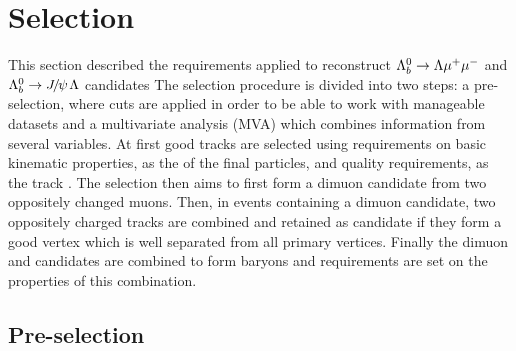 \section{Selection}
\label{sec:Lb_selection}

This section described the requirements applied to reconstruct ${{\Lambda}^0_{b}}\rightarrow{\ensuremath{\Lambda}}{\ensuremath{\mu^+\mu^-}}$ and $\Lb\to\jpsi\Lz$ candidates 
The selection procedure is divided into two steps: a pre-selection, where cuts are applied in order to be able to work
with manageable datasets and a multivariate analysis (MVA) which combines information from several variables.
At first good tracks are selected using requirements on basic kinematic properties, as the \pt of the final particles,
and quality requirements, as the track \chisq.
The selection then aims to first form a dimuon candidate from two oppositely changed muons. 
Then, in events containing a dimuon candidate, two oppositely charged tracks are combined
and retained as \Lz candidate if they form a good vertex which is well separated
from all primary vertices. Finally the dimuon and \Lz candidates are combined to form \Lb
baryons and requirements are set on the properties of this combination. 


\subsection{Pre-selection}
\label{sec:Lb_stripping}

